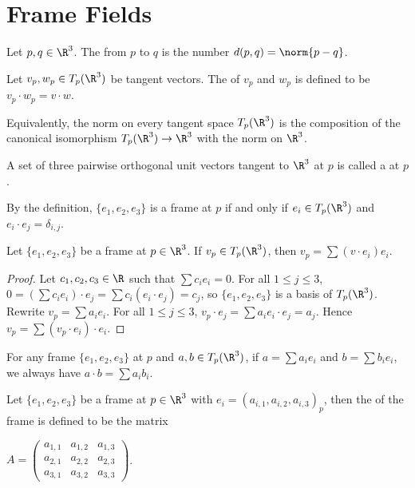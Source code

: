 \documentclass[10pt]{article}
\begin{document}
\section{Frame Fields}
\begin{definition}
    Let $p,q\in{\R}^{3}$. The  from $p$ to $q$ is the number $d(p,q)=\norm{p-q}$.
\end{definition}
\begin{definition}
    Let ${v}_{p},{w}_{p}\in{T}_{p}({\R}^{3})$ be tangent vectors. The  of ${v}_{p}$ and ${w}_{p}$ is defined to be ${v}_{p}\cdot{w}_{p}=v\cdot w$.
\end{definition}
\par
Equivalently, the norm on every tangent space ${T}_{p}({\R}^{3})$ is the composition of the canonical isomorphism ${T}_{p}({\R}^{3})\to{\R}^{3}$ with the norm on ${\R}^{3}$.
\begin{definition}
    A set of three pairwise orthogonal unit vectors tangent to ${\R}^{3}$ at $p$ is called a  at $p$.
\end{definition}
\par
By the definition, $\{{e}_{1},{e}_{2},{e}_{3}\}$ is a frame at $p$ if and only if ${e}_{i}\in{T}_{p}({\R}^{3})$ and ${e}_{i}\cdot{e}_{j}={\delta}_{i,j}$.
\begin{proposition}
    Let $\{{e}_{1},{e}_{2},{e}_{3}\}$ be a frame at $p\in{\R}^{3}$. If ${v}_{p}\in{T}_{p}({\R}^{3})$, then ${v}_{p}=\sum(v\cdot{e}_{i}){e}_{i}$.
\end{proposition}
\begin{proof}
    Let ${c}_{1},{c}_{2},{c}_{3}\in\R$ such that $\sum{c}_{i}{e}_{i}=0$. For all $1\le j\le 3$, $0=(\sum{c}_{i}{e}_{i})\cdot{e}_{j}=\sum{c}_{i}({e}_{i}\cdot{e}_{j})={c}_{j}$, so $\{{e}_{1},{e}_{2},{e}_{3}\}$ is a basis of ${T}_{p}({\R}^{3})$. Rewrite ${v}_{p}=\sum{a}_{i}{e}_{i}$. For all $1\le j\le 3$, ${v}_{p}\cdot{e}_{j}=\sum{a}_{i}{e}_{i}\cdot{e}_{j}={a}_{j}$. Hence ${v}_{p}=\sum({v}_{p}\cdot{e}_{i})\cdot{e}_{i}$.
\end{proof}
\par
For any frame $\{{e}_{1},{e}_{2},{e}_{3}\}$ at $p$ and $a,b\in{T}_{p}({\R}^{3})$, if $a=\sum{a}_{i}{e}_{i}$ and $b=\sum{b}_{i}{e}_{i}$, we always have $a\cdot b=\sum{a}_{i}{b}_{i}$.
\begin{definition}
    Let $\{{e}_{1},{e}_{2},{e}_{3}\}$ be a frame at $p\in{\R}^{3}$ with ${e}_{i}={({a}_{i,1},{a}_{i,2},{a}_{i,3})}_{p}$, then the  of the frame is defined to be the matrix
    \begin{center}
        $A=\begin{pmatrix}
            {a}_{1,1} & {a}_{1,2} & {a}_{1,3} \\
            {a}_{2,1} & {a}_{2,2} & {a}_{2,3} \\
            {a}_{3,1} & {a}_{3,2} & {a}_{3,3}
        \end{pmatrix}$.
    \end{center}
\end{definition}
\end{document}
